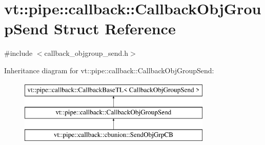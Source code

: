 \hypertarget{structvt_1_1pipe_1_1callback_1_1_callback_obj_group_send}{}\section{vt\+:\+:pipe\+:\+:callback\+:\+:Callback\+Obj\+Group\+Send Struct Reference}
\label{structvt_1_1pipe_1_1callback_1_1_callback_obj_group_send}


{\ttfamily \#include $<$callback\+\_\+objgroup\+\_\+send.\+h$>$}

Inheritance diagram for vt\+:\+:pipe\+:\+:callback\+:\+:Callback\+Obj\+Group\+Send\+:\begin{figure}[H]
\begin{center}
\leavevmode
\includegraphics[height=3.000000cm]{structvt_1_1pipe_1_1callback_1_1_callback_obj_group_send}
\end{center}
\end{figure}
